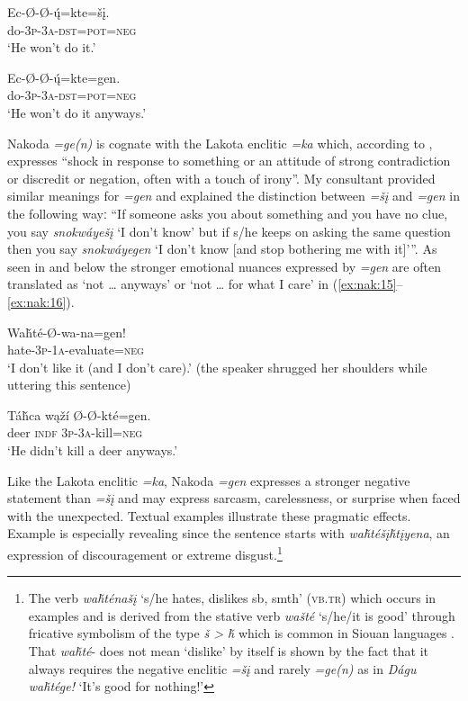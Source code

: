 \documentclass[output=paper,colorlinks,citecolor=brown]{langscibook}
\begin{document}
\ea\label{ex:nak:14}
    \ea\label{ex:nak:14a}
        \gll Ec-Ø-Ø-\'{ų}=kte=šį. \\
             do-\textsc{3p-3a-dst=pot=neg} \\
        \glt ‘He won’t do it.’
    
    \ex\label{ex:nak:14b}
        \gll Ec-Ø-Ø-\'{ų}=kte=gen. \\
             do-\textsc{3p-3a-dst=pot=neg} \\
        \glt ‘He won’t do it anyways.’
    \z
\z 


Nakoda \textit{=ge(n)} is cognate with the Lakota enclitic \textit{=ka} which, according to \citet[69]{Ullrich2011}, expresses “shock in response to something or an attitude of strong contradiction or discredit or negation, often with a touch of irony”. My consultant provided similar meanings for \textit{=gen} and explained the distinction between \textit{=šį} and \textit{=gen} in the following wayː “If someone asks you about something and you have no clue, you say \textit{snokwáyešį} ‘I don’t know’ but if s/he keeps on asking the same question then you say \textit{snokwáyegen} ‘I don’t know [and stop bothering me with it]’”. As seen in  and below the stronger emotional nuances expressed by \textit{=gen} are often translated as ‘not … anyways’ or ‘not … for what I care’ in (\ref{ex:nak:15}--\ref{ex:nak:16}).

\ea\label{ex:nak:15}
    \gll Waȟté-Ø-wa-na=gen!\\
         hate-\textsc{3p-1a}-evaluate=\textsc{neg}\\
    \glt ‘I don’t like it (and I don’t care).’ (the speaker shrugged her shoulders while uttering this sentence)
\z

\ea\label{ex:nak:16}
    \gll Táȟca wąží Ø-Ø-kté=gen.\\
         deer \textsc{indf} \textsc{3p-3a}-kill=\textsc{neg}\\
    \glt ‘He didn’t kill a deer anyways.’
\z 

Like the Lakota enclitic \textit{=ka}, Nakoda \textit{=gen} expresses a stronger negative statement than \textit{=šį} and may express sarcasm, carelessness, or surprise when faced with the unexpected. Textual examples illustrate these pragmatic effects. Example  is especially revealing since the sentence starts with \textit{waȟtéšįȟtįyena}, an expression of discouragement or extreme disgust.\footnote{The
    verb \textit{waȟténašį} ‘s/he hates, dislikes sb, smth’ (\textsc{vb.tr}) which occurs in examples  and  is derived from the stative verb \textit{wašté} ‘s/he/it is good’ through fricative symbolism of the type \textit{š > ȟ} which is common in Siouan languages \citep[181, fn 4]{RankinEtAl2003}. That \textit{waȟté}- does not mean ‘dislike’ by itself is shown by the fact that it always requires the negative enclitic \textit{=šį} and rarely \textit{=ge(n)} as in \textit{Dágu waȟtége!} ‘It’s good for nothing!’
    }
\end{document}
